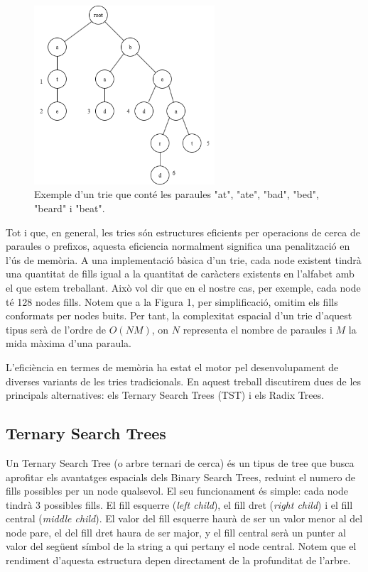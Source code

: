\begin{figure}[H]
    \centering
    \includegraphics[width=0.6\textwidth]{figures/trie_example.png}
    \caption{Exemple d'un trie que conté les paraules "at", "ate", "bad", "bed", "beard" i "beat".}
    \label{fig:trie_example}
\end{figure}
Tot i que, en general, les tries són estructures eficients per operacions de cerca de paraules o prefixos, aquesta eficiencia normalment significa una penalització en l'ús de memòria. A una implementació bàsica d'un trie, cada node existent tindrà una quantitat de fills igual a la quantitat de caràcters existents en l'alfabet amb el que estem treballant. Això vol dir que en el nostre cas, per exemple, cada node té 128 nodes fills. Notem que a la Figura 1, per simplificació, omitim els fills conformats per nodes buits. 
Per tant, la complexitat espacial d'un trie d'aquest tipus serà de l'ordre de $ O(NM) $, on $N$ representa el nombre de paraules i $M$ la mida màxima d'una paraula. 
 
L'eficiència en termes de memòria ha estat el motor pel desenvolupament de diverses variants de les tries tradicionals. En aquest treball discutirem dues de les principals alternatives: els Ternary Search Trees (TST) i els Radix Trees. 
\subsection{Ternary Search Trees}
Un Ternary Search Tree (o arbre ternari de cerca) és un tipus de tree que busca aprofitar els avantatges espacials dels Binary Search Trees, reduint el numero de fills possibles per un node qualsevol. 
El seu funcionament és simple: cada node tindrà 3 possibles fills. El fill esquerre (\textit{left child}), el fill dret (\textit{right child}) i el fill central (\textit{middle child}). El valor del fill esquerre haurà de ser un valor menor al del node pare, el del fill dret haura de ser major, y el fill central serà un punter al valor del següent símbol de la string a qui pertany el node central.
Notem que el rendiment d'aquesta estructura depen directament de la profunditat de l'arbre.  

